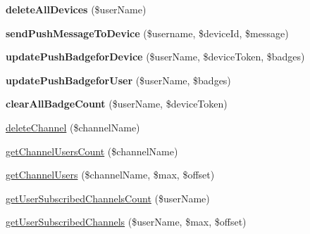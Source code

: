 \begin{DoxyCompactItemize}
\item 
\hypertarget{class_push_notification_service_adde4da1d6091bc5df6fa1a6d251305f3}{{\bfseries delete\+All\+Devices} (\$user\+Name)}\label{class_push_notification_service_adde4da1d6091bc5df6fa1a6d251305f3}

\item 
\hypertarget{class_push_notification_service_a348d3935bc0fbeaef5ae730a63fc2fbb}{{\bfseries send\+Push\+Message\+To\+Device} (\$username, \$device\+Id, \$message)}\label{class_push_notification_service_a348d3935bc0fbeaef5ae730a63fc2fbb}

\item 
\hypertarget{class_push_notification_service_ae3f7090e16c6b045a1fbf41c476bb8e7}{{\bfseries update\+Push\+Badgefor\+Device} (\$user\+Name, \$device\+Token, \$badges)}\label{class_push_notification_service_ae3f7090e16c6b045a1fbf41c476bb8e7}

\item 
\hypertarget{class_push_notification_service_ab320c07bfb5836f55404112dae230f18}{{\bfseries update\+Push\+Badgefor\+User} (\$user\+Name, \$badges)}\label{class_push_notification_service_ab320c07bfb5836f55404112dae230f18}

\item 
\hypertarget{class_push_notification_service_a00cffd4317482a96de59f9533cdead5d}{{\bfseries clear\+All\+Badge\+Count} (\$user\+Name, \$device\+Token)}\label{class_push_notification_service_a00cffd4317482a96de59f9533cdead5d}

\item 
\hyperlink{class_push_notification_service_a7c05d342b993f465b4f0b294c93b0ca8}{delete\+Channel} (\$channel\+Name)
\item 
\hyperlink{class_push_notification_service_a27f26d4dd4e1bb5292f37b1f8d019c9c}{get\+Channel\+Users\+Count} (\$channel\+Name)
\item 
\hyperlink{class_push_notification_service_aad65d9547f3b9857d94b62d3e9800576}{get\+Channel\+Users} (\$channel\+Name, \$max, \$offset)
\item 
\hyperlink{class_push_notification_service_a321ba7f1ec31f9159e83bdec623021fa}{get\+User\+Subscribed\+Channels\+Count} (\$user\+Name)
\item 
\hyperlink{class_push_notification_service_a399192ebe37565cd84b0727b40eea130}{get\+User\+Subscribed\+Channels} (\$user\+Name, \$max, \$offset)
\end{DoxyCompactItemize}
